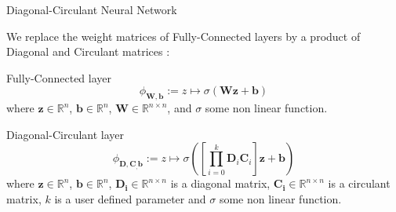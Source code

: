 \documentclass[9pt]{beamer}
\begin{document}
\begin{frame}{Diagonal-Circulant Neural Network}

We replace the weight matrices of Fully-Connected layers by a product of Diagonal and Circulant matrices :

\begin{block}{Fully-Connected layer}
\begin{equation*}
    \phi_{\mathbf{W},\mathbf{b}} := z \mapsto \sigma(\mathbf{W} \mathbf{z} + \mathbf{b})
\end{equation*}
where $\mathbf{z} \in \mathbb{R}^n$, $\mathbf{b} \in \mathbb{R}^n$, $\mathbf{W} \in \mathbb{R}^{n \times n}$, and $\sigma$ some non linear function.
\end{block}

\begin{block}{Diagonal-Circulant layer}
\begin{equation*}
    \phi_{\mathbf{D}, \mathbf{C}_, \mathbf{b}} := z \mapsto \sigma \left( \left[ \prod_{i=0}^{k} \mathbf{D}_i \mathbf{C}_i \right] \mathbf{z} + \mathbf{b} \right)
\end{equation*}
where $\mathbf{z} \in \mathbb{R}^n$, $\mathbf{b} \in \mathbb{R}^n$, $\mathbf{D_i} \in \mathbb{R}^{n \times n}$ is a diagonal matrix, $\mathbf{C_i} \in \mathbb{R}^{n \times n}$ is a circulant matrix, $k$ is a user defined parameter and $\sigma$ some non linear function.
\end{block}

\end{frame}





\end{document}
